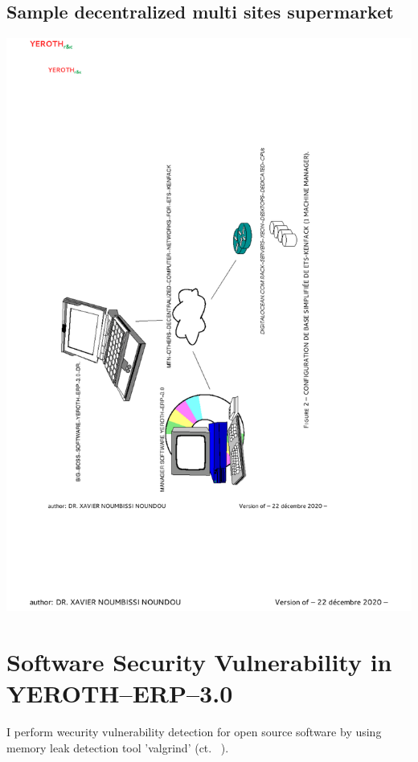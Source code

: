 \newpage

\subsection{Sample decentralized multi sites supermarket}

\begin{center}
\includegraphics[scale=0.81]{images/yeroth-sample-decentralized-multi-sites-supermarket.pdf}
\label{fig:sample-decentralized-multi-sites-supermarket}
\end{center}

\newpage

\section{Software Security Vulnerability in YEROTH--ERP--3.0}

I perform wecurity vulnerability detection for open source
software \yerotherpblack by using memory leak detection
tool 'valgrind' (ct. ~\cite{}).
